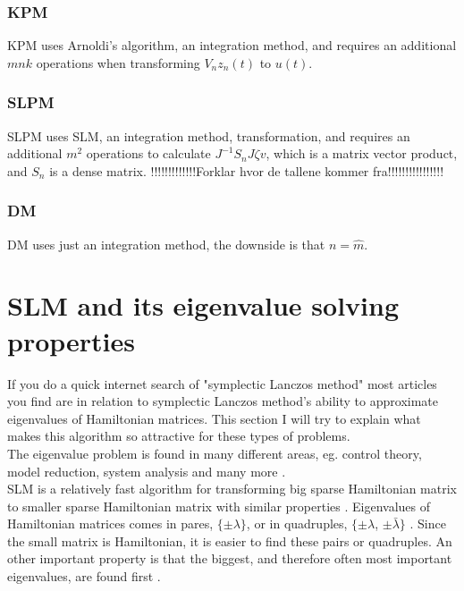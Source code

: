 \subsubsection{KPM} \label{sec:KPMcc}
KPM uses Arnoldi's algorithm, an integration method, and requires an additional $mnk$ operations when transforming $V_n z_n(t)$ to $ u(t)$.

\subsubsection{SLPM} \label{sec:SLPMcc}
SLPM uses SLM, an integration method, transformation, and requires an additional $m^2$ operations to calculate $ J^{-1} S_n J \zeta v $, which is a matrix vector product, and $S_n$ is a dense matrix.
!!!!!!!!!!!!!Forklar hvor de tallene kommer fra!!!!!!!!!!!!!!!!\\

\subsubsection{DM} \label{sec:DMcc}
DM uses just an integration method, the downside is that $n = \hat{m}$.

\section{SLM and its eigenvalue solving properties} %
If you do a quick internet search of "symplectic Lanczos method" most articles you find are in relation to symplectic Lanczos method's ability to approximate eigenvalues of Hamiltonian matrices. This section I will try to explain what makes this algorithm so attractive for these types of problems. \\

The eigenvalue problem is found in many different areas, eg. control theory, model reduction, system analysis and many more \cite{schur} \cite{2}. \\

SLM is a relatively fast algorithm\cite{1} for transforming big sparse Hamiltonian matrix to smaller sparse Hamiltonian matrix with similar properties \cite{1,2,3}. Eigenvalues of Hamiltonian matrices comes in pares, $\{ \pm \lambda \} $, or in quadruples, $\{ \pm \lambda $, $\pm \bar{\lambda} \} $ \cite{2}. Since the small matrix is Hamiltonian, it is easier to find these pairs or quadruples. An other important property is that the biggest, and therefore often most important eigenvalues, are found first \cite{!!!!!!!!2!!!!!!!!}.\\

